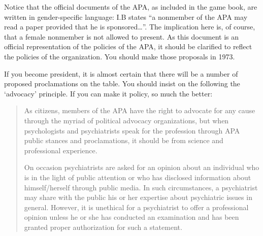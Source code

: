 Notice that the official documents of the APA, as included in the game book, are written in gender-specific language: I.B states “a nonmember of the APA may read a paper provided that he is sponsored{\ldots}”. The implication here is, of course, that a female nonmember is not allowed to present. As this document is an official representation of the policies of the APA, it should be clarified to reflect the policies of the organization. You should make those proposals in 1973.

If you become president, it is almost certain that there will be a number of proposed proclamations on the table. You should insist on the following the `advocacy' principle. If you can make it policy, so much the better:

\begin{quote}

As citizens, members of the APA have the right to advocate for any cause through the myriad of political advocacy organizations, but when psychologists and psychiatrists speak for the profession through APA public stances and proclamations, it should be from science and professional experience.

On occasion psychiatrists are asked for an opinion about an individual who is in the light of public attention or who has disclosed information about himself\slash herself through public media. In such circumstances, a psychiatrist may share with the public his or her expertise about psychiatric issues in general. However, it is unethical for a psychiatrist to offer a professional opinion unless he or she has conducted an examination and has been granted proper authorization for such a statement.
\end{quote}

